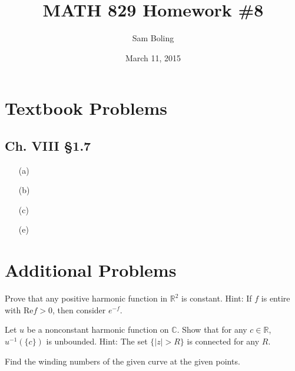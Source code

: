 \documentclass{article}
\title{MATH 829 Homework \#8}
\date{March 11, 2015}
\author{Sam Boling}
\newcounter{Problem}
\newenvironment{Problem}{\begin{Exercise}[name={Problem},
                                          counter={Problem}]}
                        {\end{Exercise}}
\begin{document}
\begin{titlepage}
\maketitle
\end{titlepage}

\section{Textbook Problems}
\subsection*{Ch. VIII \S 1.7}
\begin{itemize}
  \item[(a)]{}
  \item[(b)]{}
  \item[(c)]{}
  \item[(e)]{}
\end{itemize}

\section{Additional Problems}
\begin{Problem}
Prove that any positive harmonic function in $\mathbb{R}^2$ is constant.
Hint: If $f$ is entire with $\mathrm{Re} f > 0$, then consider $e^{-f}$.
\end{Problem}

\begin{Answer}
\end{Answer}

\begin{Problem}
Let $u$ be a nonconstant harmonic function on $\mathbb{C}$. Show that
for any $c \in \mathbb{R}$, $u^{-1}(\{ c \})$ is unbounded.
Hint: The set $\{ |z| > R \}$ is connected for any $R$.
\end{Problem}

\begin{Problem}
Find the winding numbers of the given curve at the given points.
\end{Problem}
\end{document}
